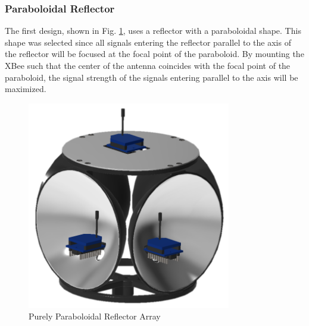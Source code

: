 \subsubsection{Paraboloidal Reflector}\label{subsec:paraboloidalReflector}
The first design, shown in Fig. \ref{fig:paraboloidalReflector}, uses a reflector with a paraboloidal shape. This shape was selected since all signals entering the reflector parallel to the axis of the reflector will be focused at the focal point of the paraboloid. By mounting the XBee such that the center of the antenna coincides with the focal point of the paraboloid, the signal strength of the signals entering parallel to the axis will be maximized.
\begin{figure}
    \centering
    \includegraphics[width=3.5in]{figs/img/paraboloidalReflector.png}
    \caption{Purely Paraboloidal Reflector Array}
    \label{fig:paraboloidalReflector}
\end{figure}

